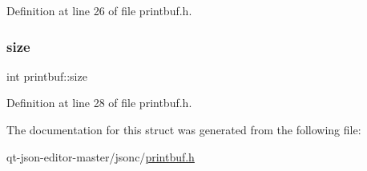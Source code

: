 Definition at line 26 of file printbuf.\+h.

\mbox{\label{structprintbuf_a12ce6440eaa06a55b96ebdc5a9778dd5}} 
\subsubsection{\texorpdfstring{size}{size}}
{\footnotesize\ttfamily int printbuf\+::size}



Definition at line 28 of file printbuf.\+h.



The documentation for this struct was generated from the following file\+:\begin{DoxyCompactItemize}
\item 
qt-\/json-\/editor-\/master/jsonc/\hyperlink{printbuf_8h}{printbuf.\+h}\end{DoxyCompactItemize}

